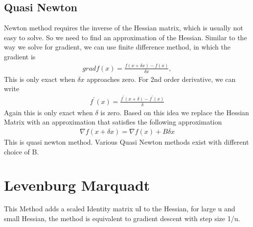 \documentclass[a4paper]{article}
\begin{document}
\subsection{Quasi Newton}
Newton method requires the inverse of the Hessian matrix, which is usually not easy to solve. So we need to find an approximation of the Hessian. Similar to the way we solve for gradient, we can use finite difference method, in which the gradient is
\begin{align*}
	grad f(x) = \frac{f(x+\delta x) - f(x)} {\delta x}, 
\end{align*}
This is only exact when $\delta x$ approaches zero.  For 2nd order derivative, we can write\\
\begin{align*}
	f^{'}(x) = \frac{f^{'}(x+\delta)- f^{'}(x)}{\delta}
\end{align*}
Again this is only exact when $\delta$ is zero. Based on this idea we
replace the Hessian Matrix with an approximation that satisfies the following approximation\\
\begin{align*}
	\nabla f(x + \delta x) = \nabla f(x) + B\delta x
\end{align*}
This is quasi newton method. Various Quasi Newton methods exist with different choice of B.\\

\section{Levenburg Marquadt}
This Method adds a scaled Identity matrix uI to the Hessian, for large u and small Hessian, the method is equivalent to gradient descent with step size 1/u.\\
\end{document}
